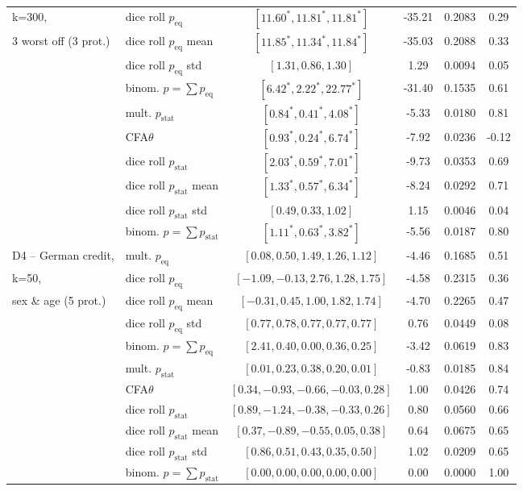 \begin{table}[t!]
{\begin{tabular}{llcccc}
		k=300, 					& dice roll $p_{\text{eq}}$		& $[11.60^*, 11.81^*, 11.81^*]$	& -35.21	& 0.2083 & 0.29\\
		3 worst off (3 prot.)	& dice roll $p_{\text{eq}}$ mean & $[11.85^*, 11.34^*, 11.84^*]$	& -35.03	& 0.2088 & 0.33\\
								& dice roll $p_{\text{eq}}$	std	& $[1.31, 0.86, 1.30]$	& 1.29	& 0.0094 & 0.05\\
								& binom. \algoFAIR $p = \sum p_{\text{eq}}$	& $[6.42^*,2.22^*, 22.77^*]$		&-31.40		& 0.1535 	& 0.61 \\
								\cline{2-6}
								& mult. \algoFAIR  $p_{\text{stat}}$ 	& $[0.84^*, 0.41^*, 4.08^*]$ 	& -5.33		& 0.0180 & 0.81\\
							 	& CFA$\theta$ 					& $[0.93^*, 0.24^*, 6.74^*]$ 	& -7.92		& 0.0236 & -0.12 \\
								& dice roll $p_{\text{stat}}$	& $[2.03^*, 0.59^*, 7.01^*]$	& -9.73		& 0.0353 & 0.69 \\
								& dice roll $p_{\text{stat}}$	mean & $[1.33^*, 0.57^*, 6.34^*]$	& -8.24		& 0.0292 & 0.71 \\
								& dice roll $p_{\text{stat}}$ std	& $[0.49, 0.33, 1.02]$	& 1.15		& 0.0046 & 0.04 \\
								& binom. \algoFAIR $p = \sum p_{\text{stat}}$	& $[1.11^*, 0.63^*, 3.82^*]$		& -5.56		& 0.0187 	& 0.80 \\
		\midrule
		\midrule
		D4 -- German credit, 	& mult. \algoFAIR $p_{\text{eq}}$ 	&  $[0.08, 0.50, 1.49, 1.26, 1.12]$ 	& -4.46 &	0.1685	& 0.51 \\
		k=50,					& dice roll $p_{\text{eq}}$		& $[-1.09, -0.13, 2.76, 1.28, 1.75]$	& -4.58	& 0.2315 & 0.36\\
		sex \& age (5 prot.)	& dice roll $p_{\text{eq}}$	mean	& $[-0.31, 0.45, 1.00, 1.82, 1.74]$	& -4.70	& 0.2265 & 0.47\\
								& dice roll $p_{\text{eq}}$	std	& $[0.77, 0.78, 0.77, 0.77, 0.77]$	& 0.76	& 0.0449 & 0.08\\
								& binom. \algoFAIR $p = \sum p_{\text{eq}}$	& $[2.41,0.40, 0.00, 0.36, 0.25]$	&-3.42	& 0.0619 	& 0.83 \\
								\cline{2-6}
		& mult. \algoFAIR $p_{\text{stat}}$ 	&  $[0.01, 0.23, 0.38, 0.20, 0.01]$		& -0.83 &	0.0185	& 0.84 \\
								& CFA$\theta$ 					&  $[0.34, -0.93, -0.66, -0.03, 0.28]$ 	& 1.00	& 0.0426	& 0.74 \\
								& dice roll $p_{\text{stat}}$	& $[0.89, -1.24, -0.38, -0.33, 0.26]$	& 0.80		& 0.0560 & 0.66 \\
								& dice roll $p_{\text{stat}}$ mean	& $[0.37, -0.89, -0.55, 0.05, 0.38]$	& 0.64		& 0.0675 & 0.65 \\
								& dice roll $p_{\text{stat}}$ std	& $[0.86, 0.51, 0.43, 0.35, 0.50]$	& 1.02		& 0.0209 & 0.65 \\
								& binom. \algoFAIR $p = \sum p_{\text{stat}}$	& $[0.00,0.00, 0.00, 0.00, 0.00]$		& 0.00		& 0.0000	& 1.00 \\


\end{tabular}}
\end{table}
